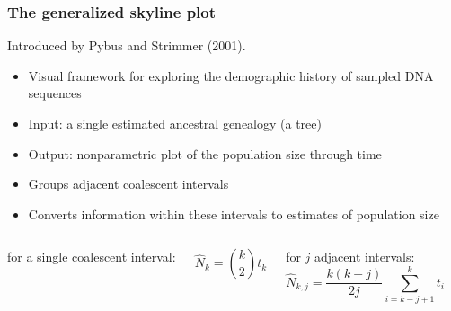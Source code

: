 \begin{frame}
\frametitle{The generalized skyline plot}

Introduced by Pybus and Strimmer (2001).

\begin{itemize}
\item Visual framework for exploring the demographic history of sampled DNA sequences
\item Input: a single estimated ancestral genealogy (a tree)
\item Output: nonparametric plot of the population size through time
\item Groups adjacent coalescent intervals 
\item Converts information within these intervals to estimates of population size
\end{itemize}

\medskip
\begin{columns}[t]

for a single coalescent interval:

\begin{equation*}
\hat{N}_k = \binom{k}{2}t_k
\end{equation*}

for $j$ adjacent intervals:
\begin{equation*}
\hat{N}_{k,j} = \frac{k(k-j)}{2j}\sum_{i=k-j+1}^k{t_i}
\end{equation*}

\end{columns}

\end{frame}

